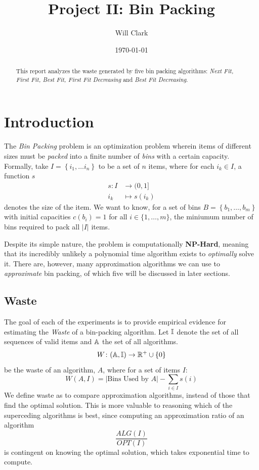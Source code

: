 \documentclass[11pt]{article}
\title{\textbf{Project II: Bin Packing}}
\author{Will Clark}
\date{\today}
\begin{document}
\maketitle

\begin{abstract}
	\noindent This report analyzes the waste generated by five bin packing
	algorithms: \emph{Next Fit, First Fit, Best Fit, First Fit Decreasing}
	and \emph{Best Fit Decreasing}.

\end{abstract}

\section{Introduction}
The \emph{Bin Packing} problem is an optimization problem wherein items of
different sizes must be \emph{packed} into a finite number of \emph{bins} with
a certain capacity. Formally, take $I = \left\{i_1, \dots i_n \right\}$ to be
a set of $n$ items, where for each $i_k \in I$, a function $s$
\begin{align*}
	s \colon  I & \to (0, 1]     \\
	i_k         & \mapsto s(i_k)
\end{align*}
denotes the size of the item. We want to know, for a set of bins
$B = \left\{ b_1, \dots, b_m \right\}$ with initial capacities $c(b_i) = 1$ for
all $i \in \{1, \dots, m\}$, the miniumum number of bins required to pack all
$|I|$ items.

Despite its simple nature, the problem is computationally
\textbf{NP-Hard}, meaning that its incredibly unlikely a polynomial time
algorithm exists to \emph{optimally} solve it. There are, however, many
approximation algorithms we can use to \emph{approximate} bin packing, of which
five will be discussed in later sections.

\subsection{Waste}
The goal of each of the experiments is to provide empirical evidence for
estimating the \emph{Waste} of a bin-packing algorithm. Let $\mathbb{I}$ denote the
set of all sequences of valid items and $\mathbb{A}$ the set of all algorithms.
\begin{equation*}
	W \colon (\mathbb{A}, \mathbb{I}) \to \mathbb{R}^+ \cup \left\{ 0 \right\}
\end{equation*}
be the waste of an algorithm, $A$,  where for a set of items $I$:
\begin{equation*}
	W(A, I) = |\text{Bins Used by }A| - \sum_{i \in I} s(i)
\end{equation*}
We define waste as to compare approximation algorithms, instead of those that
find the optimal solution. This is more valuable to reasoning which of the
superceding algorithms is best, since computing an approximation ratio
of an algorithm
\begin{equation*}
	\frac{ALG(I)}{OPT(I)}
\end{equation*}
is contingent on knowing the optimal solution, which takes exponential time
to compute.
\end{document}
